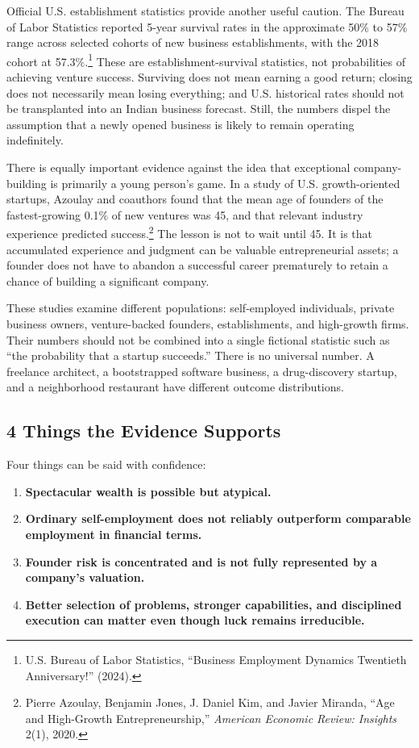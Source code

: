 Official U.S. establishment statistics provide another useful caution. The Bureau of Labor Statistics reported 5-year survival rates in the approximate 50\% to 57\% range across selected cohorts of new business establishments, with the 2018 cohort at 57.3\%.\footnote{U.S. Bureau of Labor Statistics, ``Business Employment Dynamics Twentieth Anniversary!'' (2024).} These are establishment-survival statistics, not probabilities of achieving venture success. Surviving does not mean earning a good return; closing does not necessarily mean losing everything; and U.S. historical rates should not be transplanted into an Indian business forecast. Still, the numbers dispel the assumption that a newly opened business is likely to remain operating indefinitely.

There is equally important evidence against the idea that exceptional company-building is primarily a young person's game. In a study of U.S. growth-oriented startups, Azoulay and coauthors found that the mean age of founders of the fastest-growing 0.1\% of new ventures was 45, and that relevant industry experience predicted success.\footnote{Pierre Azoulay, Benjamin Jones, J. Daniel Kim, and Javier Miranda, ``Age and High-Growth Entrepreneurship,'' \textit{American Economic Review: Insights} 2(1), 2020.} The lesson is not to wait until 45. It is that accumulated experience and judgment can be valuable entrepreneurial assets; a founder does not have to abandon a successful career prematurely to retain a chance of building a significant company.

These studies examine different populations: self-employed individuals, private business owners, venture-backed founders, establishments, and high-growth firms. Their numbers should not be combined into a single fictional statistic such as ``the probability that a startup succeeds.'' There is no universal number. A freelance architect, a bootstrapped software business, a drug-discovery startup, and a neighborhood restaurant have different outcome distributions.

\subsection{4 Things the Evidence Supports}

Four things can be said with confidence:
\begin{enumerate}[label=\textbf{\arabic*.},leftmargin=11pt,itemsep=1.5pt,topsep=1.5pt,parsep=0pt]
  \item \textbf{Spectacular wealth is possible but atypical.}
  \item \textbf{Ordinary self-employment does not reliably outperform comparable employment in financial terms.}
  \item \textbf{Founder risk is concentrated and is not fully represented by a company's valuation.}
  \item \textbf{Better selection of problems, stronger capabilities, and disciplined execution can matter even though luck remains irreducible.}
\end{enumerate}

